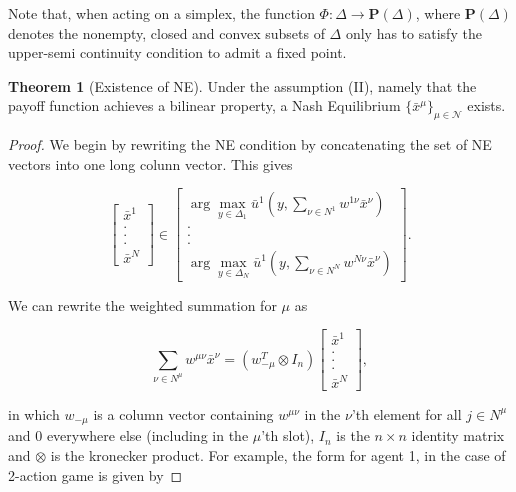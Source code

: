 \documentclass{article}
\theoremstyle{definition}
\newtheorem{theorem}{Theorem}
\newcommand{\agentset}{\mathcal{N}}
\begin{document}
	Note that, when acting on a simplex, the function $\Phi: \Delta \rightarrow \textbf{P}(\Delta)$, where $\textbf{P}(\Delta)$ denotes the nonempty, closed and convex subsets of $\Delta$ only has to satisfy the upper-semi continuity condition to admit a fixed point.

	\begin{theorem}[Existence of NE]
		Under the assumption (II), namely that the payoff function achieves a bilinear property, a
		Nash Equilibrium $\{\bar{x}^\mu\}_{\mu \in \agentset}$ exists.
	\end{theorem}

	\begin{proof}
		We begin by rewriting the NE condition by concatenating the set of NE vectors into one long colunn vector. This gives

		\begin{equation}
			\begin{bmatrix}
				\bar{x}^1 \\ . \\ . \\ . \\ \bar{x}^N
			\end{bmatrix} \in
			\begin{bmatrix}
			\arg\max_{y \in \Delta_1} \bar{u}^1(y, \sum_{\nu \in N^1} w^{1 \nu} \bar{x}^\nu) \\ . \\ . \\ . \\ \arg\max_{y \in \Delta_N} \bar{u}^1(y, \sum_{\nu \in N^N} w^{N \nu} \bar{x}^\nu)
			\end{bmatrix}	.
		\end{equation}

		We can rewrite the weighted summation for $\mu$ as

		\begin{equation}
			\sum_{\nu \in N^\mu} w^{\mu \nu} \bar{x}^\nu = (w_{-\mu}^T \otimes I_n) \begin{bmatrix}
				\bar{x}^1 \\ . \\ . \\ . \\ \bar{x}^N
			\end{bmatrix},
		\end{equation}
	
		in which $w_{-\mu}$ is a column vector containing $w^{\mu \nu}$ in the $\nu$'th element for all $j \in N^\mu$ and 0 everywhere else (including in the $\mu$'th slot), $I_n$ is the $n \times n$ identity matrix and $\otimes$ is the kronecker product. For example, the form for agent 1, in the case of 2-action game is given by


\end{proof}
\end{document}
